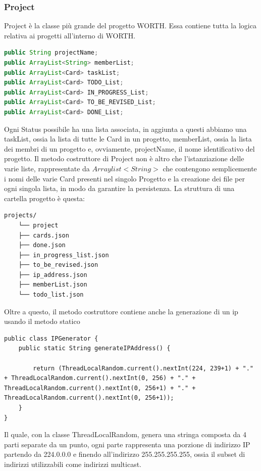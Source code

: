 \documentclass[]{article}
\begin{document}
\subsubsection{Project}
Project è la classe più grande del progetto WORTH. Essa contiene tutta la logica relativa ai progetti all'interno di WORTH.
\begin{lstlisting}[language=java]
public String projectName;
public ArrayList<String> memberList;
public ArrayList<Card> taskList;
public ArrayList<Card> TODO_List;
public ArrayList<Card> IN_PROGRESS_List;
public ArrayList<Card> TO_BE_REVISED_List;
public ArrayList<Card> DONE_List;
\end{lstlisting}
Ogni Status possibile ha una lista associata, in aggiunta a questi abbiamo una taskList, ossia la lista di tutte le Card in un progetto, memberList, ossia la lista dei membri di un progetto e, ovviamente, projectName, il nome identificativo del progetto.
Il metodo costruttore di Project non è altro che l'istanziazione delle varie liste, rappresentate da $Arraylist<String>$ che contengono semplicemente i nomi delle varie Card presenti nel singolo Progetto e la creazione dei file per ogni singola lista, in modo da garantire la persistenza.
La struttura di una cartella progetto è questa:
\begin{lstlisting}[style=ascii-tree]
	projects/
	└── project
	├── cards.json
	├── done.json
	├── in_progress_list.json
	├── to_be_revised.json
	├── ip_address.json
	├── memberList.json
	└── todo_list.json
\end{lstlisting}
Oltre a questo, il metodo costruttore contiene anche la generazione di un ip usando il metodo statico
\begin{lstlisting}
public class IPGenerator {
	public static String generateIPAddress() {
		
		return (ThreadLocalRandom.current().nextInt(224, 239+1) + "." + ThreadLocalRandom.current().nextInt(0, 256) + "." + ThreadLocalRandom.current().nextInt(0, 256+1) + "." + ThreadLocalRandom.current().nextInt(0, 256+1));
	}
}
\end{lstlisting}
Il quale, con la classe ThreadLocalRandom, genera una stringa composta da 4 parti separate da un punto, ogni parte rappresenta una porzione di indirizzo IP partendo da 224.0.0.0 e finendo all'indirizzo 255.255.255.255, ossia il subset di indirizzi utilizzabili come indirizzi multicast.
\end{document}
